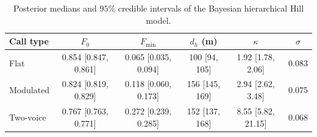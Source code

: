 \begin{table}[!ht]
\centering
\caption{Posterior medians and $95\%$ credible intervals of the Bayesian hierarchical Hill model.}
\label{tab:p5post}
\footnotesize
\begin{tabular}{lccccc}
\toprule
Call type & $F_0$ & $F_{\min}$ & $d_h$ (m) & $\kappa$ & $\sigma$ \\
\midrule
Flat & 0.854 [0.847, 0.861] & 0.065 [0.035, 0.094] & 100 [94, 105] & 1.92 [1.78, 2.06] & 0.083 \\
Modulated & 0.824 [0.819, 0.829] & 0.118 [0.060, 0.173] & 156 [145, 169] & 2.94 [2.62, 3.48] & 0.075 \\
Two-voice & 0.767 [0.763, 0.771] & 0.272 [0.239, 0.285] & 152 [137, 168] & 8.55 [5.82, 21.15] & 0.068 \\
\bottomrule
\end{tabular}
\end{table}